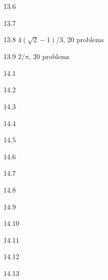 \protect \hypertarget {soln:13.6}{}
\begin{solution}{{13.6}}
\end{solution}
\protect \hypertarget {soln:13.7}{}
\begin{solution}{{13.7}}
\end{solution}
\protect \hypertarget {soln:13.8}{}
\begin{solution}{{13.8}}
  $4(\sqrt{2}-1)/3$, 20 problems
\end{solution}
\protect \hypertarget {soln:13.9}{}
\begin{solution}{{13.9}}
  $2/\pi$, 20 problems
\end{solution}
\protect \hypertarget {soln:14.1}{}
\begin{solution}{{14.1}}
\end{solution}
\protect \hypertarget {soln:14.2}{}
\begin{solution}{{14.2}}
\end{solution}
\protect \hypertarget {soln:14.3}{}
\begin{solution}{{14.3}}
\end{solution}
\protect \hypertarget {soln:14.4}{}
\begin{solution}{{14.4}}
\end{solution}
\protect \hypertarget {soln:14.5}{}
\begin{solution}{{14.5}}
\end{solution}
\protect \hypertarget {soln:14.6}{}
\begin{solution}{{14.6}}
\end{solution}
\protect \hypertarget {soln:14.7}{}
\begin{solution}{{14.7}}
\end{solution}
\protect \hypertarget {soln:14.8}{}
\begin{solution}{{14.8}}
\end{solution}
\protect \hypertarget {soln:14.9}{}
\begin{solution}{{14.9}}
\end{solution}
\protect \hypertarget {soln:14.10}{}
\begin{solution}{{14.10}}
\end{solution}
\protect \hypertarget {soln:14.11}{}
\begin{solution}{{14.11}}
\end{solution}
\protect \hypertarget {soln:14.12}{}
\begin{solution}{{14.12}}
\end{solution}
\protect \hypertarget {soln:14.13}{}
\begin{solution}{{14.13}}
\end{solution}
